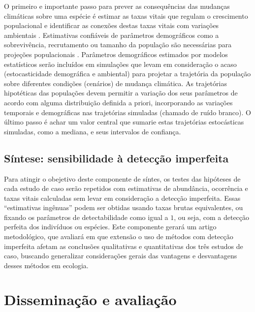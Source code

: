 \documentclass[12pt, A4]{article}
\begin{document}
O primeiro e importante passo para prever as consequências das
mudanças climáticas sobre uma espécie é estimar as taxas vitais que
regulam o crescimento populacional e identificar as conexões destas
taxas vitais com variações ambientais \citep{regehr2010}. 
Estimativas confiáveis de parâmetros demográficos como a
sobrevivência, recrutamento ou tamanho da população são necessárias
para projeções populacionais \citep{white2002}. Parâmetros
demográficos estimados por modelos estatísticos serão incluídos em
simulações que levam em consideração o acaso (estocasticidade
demográfica e ambiental) para projetar a trajetória da população sobre
diferentes condições (cenários) de mudança climática. 
As trajetórias hipotéticas das populações
devem permitir a variação dos seus parâmetros de acordo com alguma
distribuição definida a priori, incorporando as variações temporais e
demográficas nas trajetórias simuladas (chamado de ruído branco). O
último passo é achar um valor central que sumarie estas trajetórias
estocásticas simuladas, como a mediana, e seus intervalos de
confiança.

\subsection{Síntese: sensibilidade à detecção imperfeita}

Para atingir o obejetivo deste componente de síntes, os testes das hipóteses de cada estudo de
caso serão repetidos com estimativas de abundância, ocorrência e taxas
vitais calculadas sem levar em consideração a detecção
imperfeita. Essas ``estimativas ingênuas'' \citep[\emph{naive
  estimates}][]{williams2002} 
podem ser obtidas usando taxas brutas equivalentes, ou
fixando os parâmetros de detectabilidade como igual a $1$, ou seja, com
a detecção perfeita dos indivíduos ou espécies. Este componente gerará
um artigo metodológico, que avaliará em que extensão o uso de métodos
com detecção imperfeita afetam as conclusões qualitativas e
quantitativas dos três estudos de caso, buscando generalizar
considerações gerais das vantagens e desvantagens desses métodos em
ecologia. 

\section{Disseminação e avaliação}
\label{sec:diss-e-aval}
\end{document}
